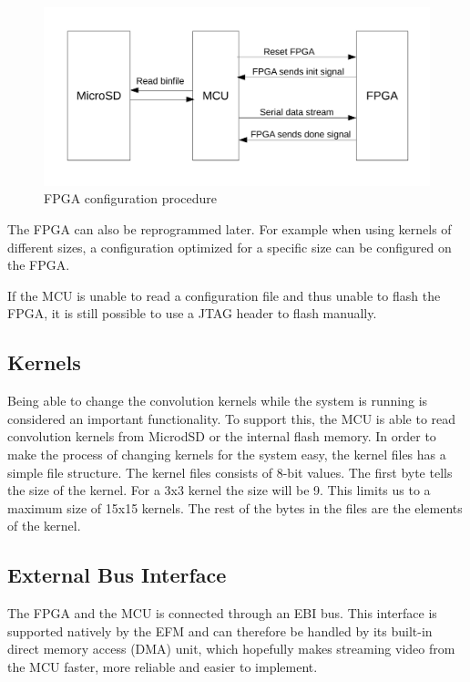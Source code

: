 \begin{figure}[h!]
    \includegraphics[width=\linewidth]{img/fpga_configuration.pdf}
    \caption{FPGA configuration procedure}
    \label{fig:fpgaConfiguration}
\end{figure}

The FPGA can also be reprogrammed later. For example when using kernels of different sizes, a configuration optimized for a specific size can be configured on the FPGA.

If the MCU is unable to read a configuration file and thus unable to flash the FPGA, it is still possible to use a JTAG header to flash manually.  

\subsection{Kernels}
Being able to change the convolution kernels while the system is running is considered an important functionality. To support this, the MCU is able to read convolution kernels from MicrodSD or the internal flash memory. 
In order to make the process of changing kernels for the system easy, the kernel files has a simple file structure. The kernel files consists of 8-bit values. The first byte tells the size of the kernel. For a 3x3 kernel the size will be 9. This limits us to a maximum size of 15x15 kernels. The rest of the bytes in the files are the elements of the kernel.

\subsection{External Bus Interface}
The FPGA and the MCU is connected through an EBI bus.
This interface is supported natively by the EFM and can therefore be handled by its built-in direct memory access (DMA) unit, which hopefully makes streaming video from the MCU faster, more reliable and easier to implement.

